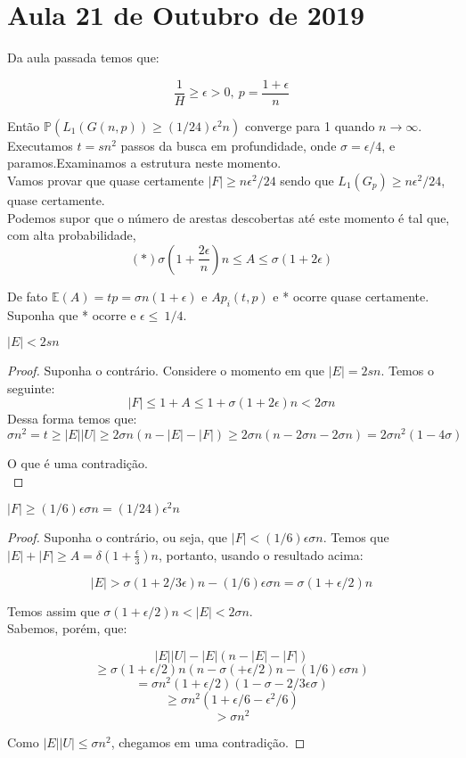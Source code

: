 \documentclass[a4paper,12pt]{article}
\begin{document}
\section{Aula 21 de Outubro de 2019}
\label{2019_10_21}

Da aula passada temos que:

\[\frac{1}{H}\geq\epsilon>0 ,\ p=\frac{1+\epsilon}{n}\]

Então $\mathbb{P}(L_1(G(n,p))\geq (1/24)\epsilon^2 n)$ converge para 1 quando $n\rightarrow\infty$.\\

Executamos $t=sn^2$ passos da busca em profundidade, onde $\sigma=\epsilon/4$, e paramos.Examinamos a estrutura neste momento.\\

Vamos provar que quase certamente $|F|\geq n\epsilon^2/24$ sendo que $L_1(G_p) \geq n\epsilon^2/24$, quase certamente.\\
Podemos supor que o número de arestas descobertas até este momento é tal que, com alta probabilidade,
\[(*)\sigma(1+\frac{2\epsilon}{n})n\leq A\leq \sigma (1+2\epsilon)\]

De fato $\mathbb{E}(A)=tp=\sigma n (1+\epsilon)$ e $Ap_i(t,p)$ e * ocorre quase certamente. Suponha que * ocorre e $\epsilon \leq\ 1/4 $.

\begin{fato}
$ |E|<2sn $
\end{fato}
\begin{proof}
Suponha o contrário. Considere o momento em que $ |E|=2sn$. Temos o seguinte:
\[|F|\leq1+A\leq1+\sigma(1+2\epsilon)n<2\sigma n\]
Dessa forma temos que:
\[\sigma n^2 = t \geq |E||U|\geq2\sigma n(n-|E|-|F|) \geq 2\sigma n (n-2\sigma n - 2\sigma n ) = 2 \sigma n^2 (1-4\sigma)\]

O que é uma contradição.\\
\end{proof}

\begin{fato}
 $|F|\geq(1/6)\epsilon\sigma n = (1/24)\epsilon ^2 n$
\end{fato}
\begin{proof}
Suponha o contrário, ou seja, que $|F|<(1/6)\epsilon\sigma n$.
Temos que $|E|+|F|\geq A = \delta (1+\frac{\epsilon}{3})n$, portanto, usando o resultado acima:

\[|E|>\sigma(1+2/3\epsilon)n-(1/6)\epsilon\sigma n = \sigma(1+\epsilon/2)n\]

Temos assim que $\sigma(1+\epsilon/2)n<|E|<2\sigma n$.\\

Sabemos, porém, que:

\[|E||U|-|E|(n-|E|-|F|)\]
\[\geq\sigma(1+\epsilon/2)n(n-\sigma(+\epsilon/2)n-(1/6)\epsilon\sigma n)\]
\[=\sigma n^2 (1+\epsilon/2)(1-\sigma-2/3\epsilon\sigma)\]
\[\geq\sigma n^2(1+\epsilon/6-\epsilon^2/6)\]
\[>\sigma n^2\]

Como $|E||U|\leq\sigma n^2$, chegamos em uma contradição.
\end{proof}
\end{document}
